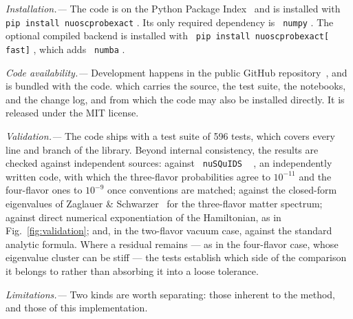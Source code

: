 \documentclass[final,5p,times,twocolumn]{elsarticle}
\newcommand{\fig}{Fig.}
\newcommand{\figu}[1]{\fig~\ref{fig:#1}}
\providecommand{\DIFaddtex}[1]{{\protect\color{blue} \sf #1}} %
\providecommand{\DIFdeltex}[1]{{\protect\color{red} \scriptsize #1}} %
\providecommand{\DIFaddbegin}{} %
\providecommand{\DIFaddend}{} %
\providecommand{\DIFdelbegin}{} %
\providecommand{\DIFdelend}{} %
\providecommand{\DIFadd}[1]{\DIFaddtex{#1}} %
\providecommand{\DIFdel}[1]{\DIFdeltex{#1}} %
\begin{document}
\smallskip

{\it \DIFadd{Installation.---}}  \DIFadd{The code is on the Python Package Index\ }\cite{NuOscProbExactPyPI} \DIFadd{and is installed with }{\tt \DIFadd{pip install nuoscprobexact}}\DIFadd{.  Its only required dependency is }{\tt \DIFadd{numpy}}\DIFadd{.  The optional compiled backend is installed with }{\tt \DIFadd{pip install nuoscprobexact}[\DIFadd{fast}]}\DIFadd{, which adds }{\tt \DIFadd{numba}}\DIFadd{.
}

\smallskip

{\it \DIFadd{Code availability.---}}  \DIFadd{Development happens in the public }\DIFaddend GitHub repository\ \cite{NuOscProbExact}, \DIFdelbegin \DIFdel{and is bundled with the code.
}\DIFdelend \DIFaddbegin \DIFadd{which carries the source, the test suite, the notebooks, and the change log, and from which the code may also be installed directly.  It is released under the MIT license.
}\DIFaddend 

\smallskip

{\it \DIFaddbegin \DIFadd{Validation.---}}  \DIFadd{The code ships with a test suite of 596 tests, which covers every line and branch of the library.  Beyond internal consistency, the results are checked against independent sources: against }{\tt \DIFadd{nuSQuIDS}}\DIFadd{\ }\cite{Delgado:2014kpa, NuSQuIDS}\DIFadd{, an independently written code, with which the three-flavor probabilities agree to $10^{-11}$ and the four-flavor ones to $10^{-9}$ once conventions are matched; against the closed-form eigenvalues of Zaglauer \& Schwarzer\ }\cite{Zaglauer:1988gz} \DIFadd{for the three-flavor matter spectrum; against direct numerical exponentiation of the Hamiltonian, as in \figu{validation}; and, in the two-flavor vacuum case, against the standard analytic formula.  Where a residual remains --- as in the four-flavor case, whose eigenvalue cluster can be stiff --- the tests establish which side of the comparison it belongs to rather than absorbing it into a loose tolerance.
}

\smallskip

{\it \DIFadd{Limitations.---}}  \DIFadd{Two kinds are worth separating: those inherent to the method, and those of this implementation.
}
\end{document}
